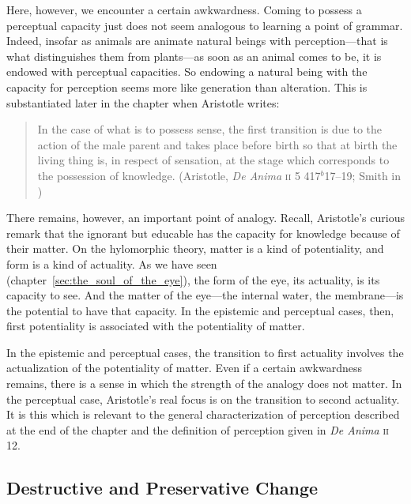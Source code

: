 Here, however, we encounter a certain awkwardness. Coming to possess a perceptual capacity just does not seem analogous to learning a point of grammar. Indeed, insofar as animals are animate natural beings with perception---that is what distinguishes them from plants---as soon as an animal comes to be, it is endowed with perceptual capacities. So endowing a natural being with the capacity for perception seems more like generation than alteration. This is substantiated later in the chapter when Aristotle writes:
\begin{quote}
	In the case of what is to possess sense, the first transition is due to the action of the male parent and takes place before birth so that at birth the living thing is, in respect of sensation, at the stage which corresponds to the possession of knowledge. (Aristotle, \emph{De Anima} \textsc{ii} 5 417\( ^{b} \)17--19; Smith in \citealt[31]{Barnes:1984uq})
\end{quote}
There remains, however, an important point of analogy. Recall, Aristotle's curious remark that the ignorant but educable has the capacity for knowledge because of their matter. On the hylomorphic theory, matter is a kind of potentiality, and form is a kind of actuality. As we have seen (chapter~\ref{sec:the_soul_of_the_eye}), the form of the eye, its actuality, is its capacity to see. And the matter of the eye---the internal water, the membrane---is the potential to have that capacity. In the epistemic and perceptual cases, then, first potentiality is associated with the potentiality of matter. 

In the epistemic and perceptual cases, the transition to first actuality involves the actualization of the potentiality of matter. Even if a certain awkwardness remains, there is a sense in which the strength of the analogy does not matter. In the perceptual case, Aristotle's real focus is on the transition to second actuality. It is this which is relevant to the general characterization of perception described at the end of the chapter and the definition of perception given in \emph{De Anima} \textsc{ii} 12.


\subsection{Destructive and Preservative Change} %
\label{sub:destructive_and_preservative_change}

